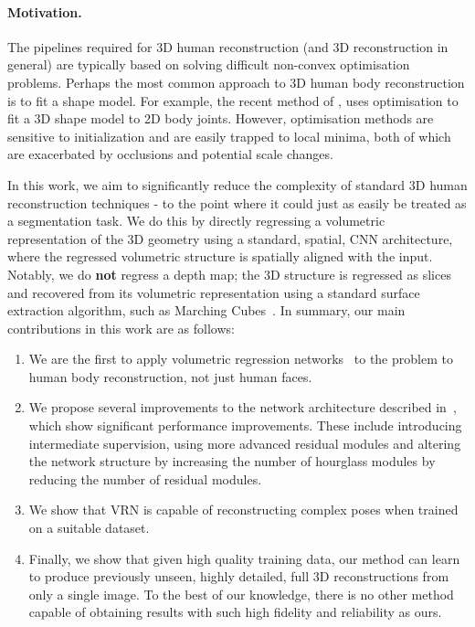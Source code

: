 \paragraph{Motivation.} The pipelines required for 3D human
reconstruction (and 3D reconstruction in general) are typically based
on solving difficult non-convex optimisation problems. Perhaps the
most common approach to 3D human body reconstruction is to fit a shape
model. For example, the recent method of \cite{bogo2016smplify}, uses
optimisation to fit a 3D shape model to 2D body joints. However,
optimisation methods are sensitive to initialization and are easily
trapped to local minima, both of which are exacerbated by occlusions
and potential scale changes.

In this work, we aim to significantly reduce the complexity of
standard 3D human reconstruction techniques - to the point where it
could just as easily be treated as a segmentation task. We do this by
directly regressing a volumetric representation of the 3D geometry
using a standard, spatial, CNN architecture, where the regressed
volumetric structure is spatially aligned with the input. Notably, we
do \textbf{not} regress a depth map; the 3D structure is regressed as
slices and recovered from its volumetric representation using a
standard surface extraction algorithm, such as Marching
Cubes~\cite{lorensen1987marching}. In summary, our main contributions
in this work are as follows:

\begin{enumerate}

\item We are the first to apply volumetric regression
  networks~\cite{jackson2017vrn} to the problem to human body
  reconstruction, not just human faces.

\item We propose several improvements to the network architecture
  described in~\cite{jackson2017vrn}, which show significant
  performance improvements. These include introducing intermediate
  supervision, using more advanced residual modules and altering the network
  structure by increasing the number of hourglass modules by reducing
  the number of residual modules.

\item We show that VRN is capable of reconstructing complex poses when
  trained on a suitable dataset.

\item Finally, we show that given high quality training data, our
  method can learn to produce previously unseen, highly detailed, full
  3D reconstructions from only a single image. To the best of our
  knowledge, there is no other method capable of obtaining results
  with such high fidelity and reliability as ours.
\end{enumerate}

